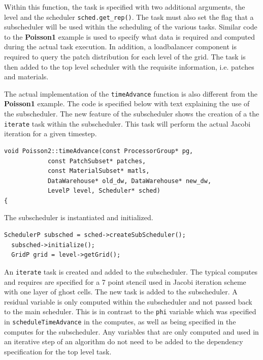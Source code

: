 \documentclass[12pt]{report}
\begin{document}
Within this function, the task is specified with two additional
arguments, the level and the scheduler \texttt{sched.get\_rep()}.  The
task must also set the flag that a subscheduler will be used within
the scheduling of the various tasks.  Similar code to the
\textbf{Poisson1} example is used to specify what data is required and
computed during the actual task execution.  In addition, a
loadbalancer component is required to query the patch distribution for
each level of the grid.  The task is then added to the top level
scheduler with the requisite information, i.e. patches and materials.

The actual implementation of the \texttt{timeAdvance} function is also
different from the \textbf{Poisson1} example.  The code is specified
below with text explaining the use of the subscheduler.  The new
feature of the subscheduler shows the creation of a the
\texttt{iterate} task within the subscheduler.  This task will perform
the actual Jacobi iteration for a given timestep.

\begin{Verbatim}[fontsize=\footnotesize]
void Poisson2::timeAdvance(const ProcessorGroup* pg,
			const PatchSubset* patches,
			const MaterialSubset* matls,
			DataWarehouse* old_dw, DataWarehouse* new_dw,
			LevelP level, Scheduler* sched)
{

\end{Verbatim}

The subscheduler is instantiated and initialized. 

\begin{Verbatim}[fontsize=\footnotesize]
  SchedulerP subsched = sched->createSubScheduler();
  subsched->initialize();
  GridP grid = level->getGrid();
\end{Verbatim}

An \texttt{iterate} task is created and added to the subscheduler.
The typical computes and requires are specified for a 7 point stencil
used in Jacobi iteration scheme with one layer of ghost cells.  The
new task is added to the subscheduler.  A residual variable is only
computed within the subscheduler and not passed back to the main
scheduler.  This is in contrast to the \texttt{phi} variable which was
specified in \texttt{scheduleTimeAdvance} in the computes, as well as
being specified in the computes for the subscheduler.  Any variables
that are only computed and used in an iterative step of an algorithm
do not need to be added to the dependency specification for the top
level task.
\end{document}
